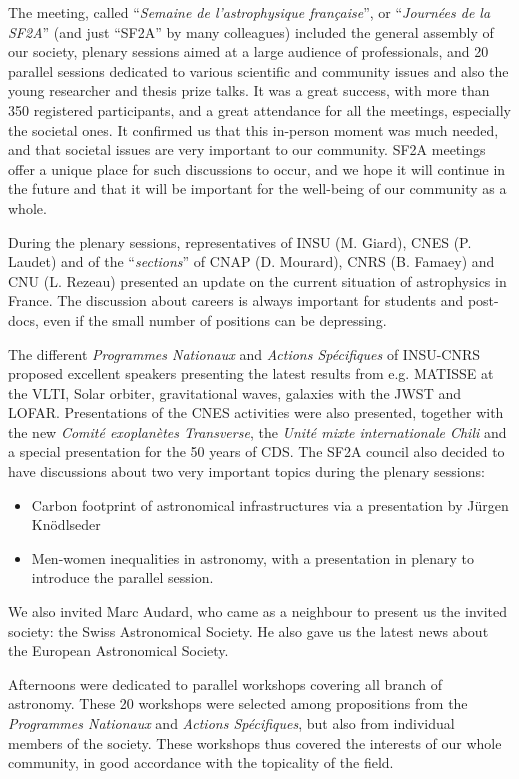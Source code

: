 The meeting, called  ``\emph{Semaine de l'astrophysique fran\c{c}aise}'', or ``\emph{Journ\'ees de la SF2A}'' (and just ``SF2A'' by many colleagues)  included
the general assembly of our society, plenary sessions aimed at a large audience of professionals, and 20 parallel sessions  dedicated to various scientific and community issues and also the young researcher and thesis prize talks.  It was a great success, with more than 350 registered participants, and a great attendance for all the meetings, especially the societal ones. It confirmed us that this in-person moment was much needed, and that societal issues are very important to our community. SF2A meetings offer a unique place for such discussions to occur, and we hope it will continue in the future and that it will be important for the well-being of our community as a whole.


During the plenary sessions, re\-pre\-sen\-ta\-ti\-ves of INSU (M. Giard), CNES (P. Laudet) and of the ``\emph{sections}'' of CNAP (D. Mourard), CNRS (B. Famaey) and CNU (L. Rezeau) presented an update on the current situation of astrophysics in France. The discussion about careers is always important for students and post-docs, even if the small number of positions can be depressing.

The different \emph{Programmes Nationaux} and \emph{Actions Sp\'ecifiques} of INSU-CNRS proposed excellent speakers presenting the latest results from e.g. MATISSE at the VLTI, Solar orbiter, gravitational waves, galaxies with the JWST and LOFAR. Presentations of the CNES activities were also presented, together with the new \emph{Comité exoplanètes Transverse}, the \emph{Unité mixte internationale Chili} and a special presentation for the 50 years of CDS. The SF2A council also  decided to have discussions about two very important topics during the plenary sessions:
\begin{itemize}
\item Carbon footprint of astronomical infrastructures via a presentation by Jürgen Knödlseder 
\item Men-women inequalities in astronomy, with a presentation in plenary to introduce the parallel session.
\end{itemize}

We also invited Marc Audard, who came as a neighbour to present us the invited society: the Swiss Astronomical Society. He also gave us the latest news about the European Astronomical Society.

Afternoons were dedicated to parallel workshops covering all branch of astronomy. These 20 workshops were selected among propositions from the \emph{Programmes Nationaux} and \emph{Actions Sp\'ecifiques}, but also from individual members of the society. These workshops thus covered the interests of our whole community, in good accordance with the topicality of the field.

